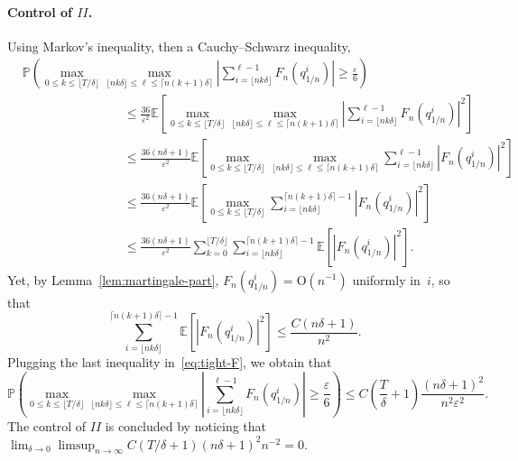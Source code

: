 \documentclass{article}
\newcommand{\dps}{\displaystyle }
\renewcommand{\leq}{\leqslant}
\renewcommand{\geq}{\geqslant}
\def\E{\mathbb{E}} %
\def\P{\mathbb{P}} %
\begin{document}
\paragraph{Control of $II$.} Using Markov's inequality, then a Cauchy--Schwarz inequality,
\begin{align}
& \P \left( \max_{0\leq k \leq \lfloor T/\delta \rfloor}\max_{\lfloor nk\delta \rfloor \leq \ell\leq \lceil n(k+1)\delta \rceil}\left |\sum_{i = \lfloor nk\delta \rfloor}^{\ell - 1}F_n(q^i_{1/n}) \right| \geq\frac{\varepsilon}{6}\right)\\
& \qquad\qquad\qquad\qquad \leq \frac{36}{\varepsilon^2}\E\left[\max_{0\leq k \leq \lfloor T/\delta \rfloor}\max_{\lfloor nk\delta \rfloor \leq \ell\leq \lceil n(k+1)\delta \rceil}\left |\sum_{i = \lfloor nk\delta \rfloor}^{\ell - 1}F_n(q^i_{1/n}) \right|^2 \right]\\
& \qquad\qquad\qquad\qquad \leq \frac{36 (n \delta+1)}{\varepsilon^2}\E\left[\max_{0\leq k \leq \lfloor T/\delta \rfloor}\max_{\lfloor nk\delta \rfloor \leq \ell\leq \lceil n(k+1)\delta \rceil} \sum_{i = \lfloor nk\delta \rfloor}^{\ell - 1}\left|F_n(q^i_{1/n}) \right|^2 \right]\\
& \qquad\qquad\qquad\qquad \leq\frac{36 (n \delta+1)}{\varepsilon^2}\E\left[\max_{0\leq k \leq \lfloor T/\delta \rfloor}\sum_{i = \lfloor nk\delta \rfloor}^{\lceil n(k+1)\delta\rceil- 1}\left|F_n(q^i_{1/n}) \right|^2 \right]\\
& \qquad\qquad\qquad\qquad \leq \frac{36 (n \delta+1)}{\varepsilon^2}\sum_{k=0}^{\lfloor T/\delta \rfloor}\sum_{i = \lfloor nk\delta \rfloor}^{\lceil n(k+1)\delta\rceil- 1}\E\left[\left|F_n(q^i_{1/n}) \right|^2 \right]. \label{eq:tight-F}
\end{align}
Yet, by Lemma~\ref{lem:martingale-part}, $F_n(q^i_{1/n}) = \mathrm{O}(n^{-1})$ uniformly in~$i$, so that
\[
\sum_{i = \lfloor nk\delta \rfloor}^{\lceil n(k+1)\delta\rceil- 1}\E\left[\left|F_n(q^i_{1/n}) \right|^2 \right] \leq \frac{C(n\delta +1)}{n^2} .
\]
Plugging the last inequality in~\eqref{eq:tight-F}, we obtain that
\[
\P \left( \max_{0\leq k \leq \lfloor T/\delta \rfloor}\max_{\lfloor nk\delta \rfloor \leq \ell\leq \lceil n(k+1)\delta \rceil}\left |\sum_{i = \lfloor nk\delta \rfloor}^{\ell - 1}F_n(q^i_{1/n}) \right| \geq\frac{\varepsilon}{6}\right) \leq C\left(\frac{T}{\delta}+1\right) \frac{(n\delta+1)^2}{n^{2} \varepsilon^{2}}.
\]
The control of $II$ is concluded by noticing that $\dps \lim_{\delta\to 0}\limsup_{n\to\infty} C(T/\delta+1) (n\delta+1)^2 n^{-2} =0$.
\end{document}
